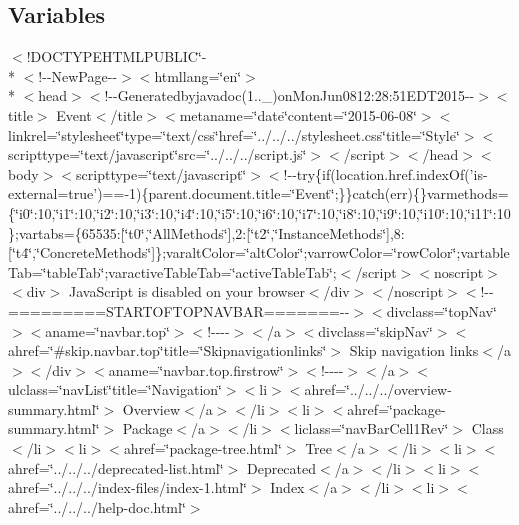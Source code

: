 \subsection*{Variables}
\begin{DoxyCompactItemize}
\item 
$<$!D\-O\-C\-T\-Y\-P\-E\-H\-T\-M\-L\-P\-U\-B\-L\-I\-C\char`\"{}-\/\\*
$<$!-\/-\/New\-Page-\/-\/$>$$<$htmllang=\char`\"{}en\char`\"{}$>$\\*
$<$head$>$$<$!-\/-\/Generatedbyjavadoc(1..\-\_)on\-Mon\-Jun0812\-:28\-:51\-E\-D\-T2015-\/-\/$>$$<$title$>$ Event$<$/title$>$$<$metaname=\char`\"{}date\char`\"{}content=\char`\"{}2015-\/06-\/08\char`\"{}$>$$<$linkrel=\char`\"{}stylesheet\char`\"{}type=\char`\"{}text/css\char`\"{}href=\char`\"{}../../../stylesheet.\-css\char`\"{}title=\char`\"{}\-Style\char`\"{}$>$$<$scripttype=\char`\"{}text/javascript\char`\"{}src=\char`\"{}../../../script.\-js\char`\"{}$>$$<$/script$>$$<$/head$>$$<$body$>$$<$scripttype=\char`\"{}text/javascript\char`\"{}$>$$<$!-\/-\/try\{if(location.\-href.\-index\-Of('is-\/external=true')==-\/1)\{parent.\-document.\-title=\char`\"{}\-Event\char`\"{};\}\}catch(err)\{\}varmethods=\{\char`\"{}i0\char`\"{}\-:10,\char`\"{}i1\char`\"{}\-:10,\char`\"{}i2\char`\"{}\-:10,\char`\"{}i3\char`\"{}\-:10,\char`\"{}i4\char`\"{}\-:10,\char`\"{}i5\char`\"{}\-:10,\char`\"{}i6\char`\"{}\-:10,\char`\"{}i7\char`\"{}\-:10,\char`\"{}i8\char`\"{}\-:10,\char`\"{}i9\char`\"{}\-:10,\char`\"{}i10\char`\"{}\-:10,\char`\"{}i11\char`\"{}\-:10\};vartabs=\{65535\-:\mbox{[}\char`\"{}t0\char`\"{},\char`\"{}\-All\-Methods\char`\"{}\mbox{]},2\-:\mbox{[}\char`\"{}t2\char`\"{},\char`\"{}\-Instance\-Methods\char`\"{}\mbox{]},8\-:\mbox{[}\char`\"{}t4\char`\"{},\char`\"{}\-Concrete\-Methods\char`\"{}\mbox{]}\};varalt\-Color=\char`\"{}alt\-Color\char`\"{};varrow\-Color=\char`\"{}row\-Color\char`\"{};vartable\-Tab=\char`\"{}table\-Tab\char`\"{};varactive\-Table\-Tab=\char`\"{}active\-Table\-Tab\char`\"{};$<$/script$>$$<$noscript$>$$<$div$>$ Java\-Script is disabled on your browser$<$/div$>$$<$/noscript$>$$<$!-\/-\/=========\-S\-T\-A\-R\-T\-O\-F\-T\-O\-P\-N\-A\-V\-B\-A\-R=======-\/-\/$>$$<$divclass=\char`\"{}top\-Nav\char`\"{}$>$$<$aname=\char`\"{}navbar.\-top\char`\"{}$>$$<$!-\/-\/-\/-\/$>$$<$/a$>$$<$divclass=\char`\"{}skip\-Nav\char`\"{}$>$$<$ahref=\char`\"{}\#skip.\-navbar.\-top\char`\"{}title=\char`\"{}\-Skipnavigationlinks\char`\"{}$>$ Skip navigation links$<$/a$>$$<$/div$>$$<$aname=\char`\"{}navbar.\-top.\-firstrow\char`\"{}$>$$<$!-\/-\/-\/-\/$>$$<$/a$>$$<$ulclass=\char`\"{}nav\-List\char`\"{}title=\char`\"{}\-Navigation\char`\"{}$>$$<$li$>$$<$ahref=\char`\"{}../../../overview-\/summary.\-html\char`\"{}$>$ Overview$<$/a$>$$<$/li$>$$<$li$>$$<$ahref=\char`\"{}package-\/summary.\-html\char`\"{}$>$ Package$<$/a$>$$<$/li$>$$<$liclass=\char`\"{}nav\-Bar\-Cell1\-Rev\char`\"{}$>$ Class$<$/li$>$$<$li$>$$<$ahref=\char`\"{}package-\/tree.\-html\char`\"{}$>$ Tree$<$/a$>$$<$/li$>$$<$li$>$$<$ahref=\char`\"{}../../../deprecated-\/list.\-html\char`\"{}$>$ Deprecated$<$/a$>$$<$/li$>$$<$li$>$$<$ahref=\char`\"{}../../../index-\/files/index-\/1.\-html\char`\"{}$>$ Index$<$/a$>$$<$/li$>$$<$li$>$$<$ahref=\char`\"{}../../../help-\/doc.\-html\char`\"{}$>$ $$
\end{DoxyCompactItemize}
